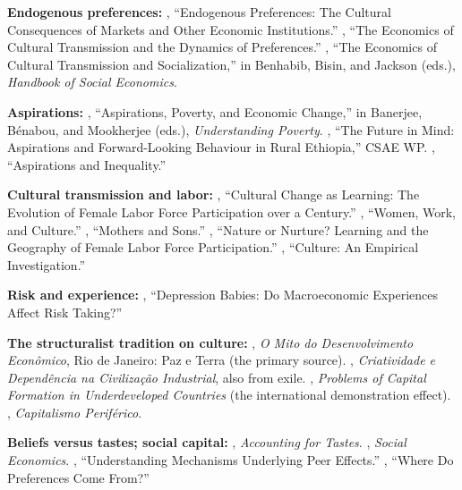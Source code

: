 \documentclass[../structural_economics_book.tex]{subfiles}
\begin{document}
\textbf{Endogenous preferences:} \citet{bowles1998endogenous}, ``Endogenous Preferences: The Cultural Consequences of Markets and Other Economic Institutions.'' \citet{bisin2001economics}, ``The Economics of Cultural Transmission and the Dynamics of Preferences.'' \citet{bisin2011economics}, ``The Economics of Cultural Transmission and Socialization,'' in Benhabib, Bisin, and Jackson (eds.), \textit{Handbook of Social Economics}.

\textbf{Aspirations:} \citet{ray2006aspirations}, ``Aspirations, Poverty, and Economic Change,'' in Banerjee, B\'{e}nabou, and Mookherjee (eds.), \textit{Understanding Poverty}. \citet{bernard2014future}, ``The Future in Mind: Aspirations and Forward-Looking Behaviour in Rural Ethiopia,'' CSAE WP. \citet{genicot2017aspirations}, ``Aspirations and Inequality.''

\textbf{Cultural transmission and labor:} \citet{fernandez2013cultural}, ``Cultural Change as Learning: The Evolution of Female Labor Force Participation over a Century.'' \citet{fernandez2007women}, ``Women, Work, and Culture.'' \citet{fernandez2004mothers}, ``Mothers and Sons.'' \citet{fogli2011nature}, ``Nature or Nurture? Learning and the Geography of Female Labor Force Participation.'' \citet{fernandez2009culture}, ``Culture: An Empirical Investigation.''

\textbf{Risk and experience:} \citet{malmendier2011depression}, ``Depression Babies: Do Macroeconomic Experiences Affect Risk Taking?''

\textbf{The structuralist tradition on culture:} \citet{furtado1974mito}, \textit{O Mito do Desenvolvimento Econ\^{o}mico}, Rio de Janeiro: Paz e Terra (the primary source). \citet{furtado1978criatividade}, \textit{Criatividade e Depend\^{e}ncia na Civiliza\c{c}\~{a}o Industrial}, also from exile. \citet{nurkse1953problems}, \textit{Problems of Capital Formation in Underdeveloped Countries} (the international demonstration effect). \citet{prebisch1981capitalismo}, \textit{Capitalismo Perif\'{e}rico}.

\textbf{Beliefs versus tastes; social capital:} \citet{becker1996accounting}, \textit{Accounting for Tastes}. \citet{becker2000social}, \textit{Social Economics}. \citet{bursztyn2014understanding}, ``Understanding Mechanisms Underlying Peer Effects.'' \citet{dietrich2013where}, ``Where Do Preferences Come From?''
\end{document}
